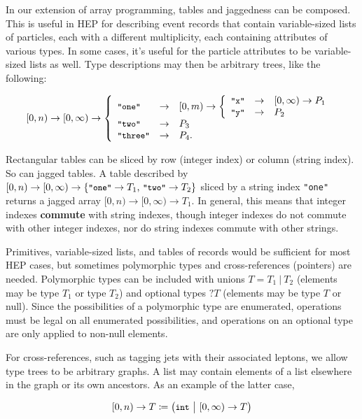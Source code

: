 \documentclass{webofc}
\begin{document}
In our extension of array programming, tables and jaggedness can be composed. This is useful in HEP for describing event records that contain variable-sized lists of particles, each with a different multiplicity, each containing attributes of various types. In some cases, it's useful for the particle attributes to be variable-sized lists as well. Type descriptions may then be arbitrary trees, like the following:

\vspace{-\baselineskip}
\[ [0, n) \to [0, \infty) \to \left\{\begin{array}{l c l}
\mbox{\small\tt "one"} & \to & [0, m) \to \left \{\begin{array}{l c l} \mbox{\small\tt "x"} & \to & [0, \infty) \to P_1 \\ \mbox{\small\tt "y"} & \to & P_2 \end{array}\right. \\
\mbox{\small\tt "two"} & \to & P_3 \\
\mbox{\small\tt "three"} & \to & P_4\mbox{.} \end{array}\right. \]

Rectangular tables can be sliced by row (integer index) or column (string index). So can jagged tables. A table described by $[0, n) \to [0, \infty) \to \{\mbox{\small\tt "one"} \to T_1\mbox{, }\mbox{\small\tt "two"} \to T_2\}$ sliced by a string index {\small\tt "one"} returns a jagged array $[0, n) \to [0, \infty) \to T_1$. In general, this means that integer indexes {\bf commute} with string indexes, though integer indexes do not commute with other integer indexes, nor do string indexes commute with other strings.

Primitives, variable-sized lists, and tables of records would be sufficient for most HEP cases, but sometimes polymorphic types and cross-references (pointers) are needed. Polymorphic types can be included with unions $T = T_1\ |\ T_2$ (elements may be type $T_1$ or type $T_2$) and optional types $?T$ (elements may be type $T$ or null). Since the possibilities of a polymorphic type are enumerated, operations must be legal on all enumerated possibilities, and operations on an optional type are only applied to non-null elements.

For cross-references, such as tagging jets with their associated leptons, we allow type trees to be arbitrary graphs. A list may contain elements of a list elsewhere in the graph or its own ancestors. As an example of the latter case,

\[ [0, n) \to T \coloneqq \big( \mbox{\small\tt int}\ \big|\ [0, \infty) \to T \big) \]
\end{document}
